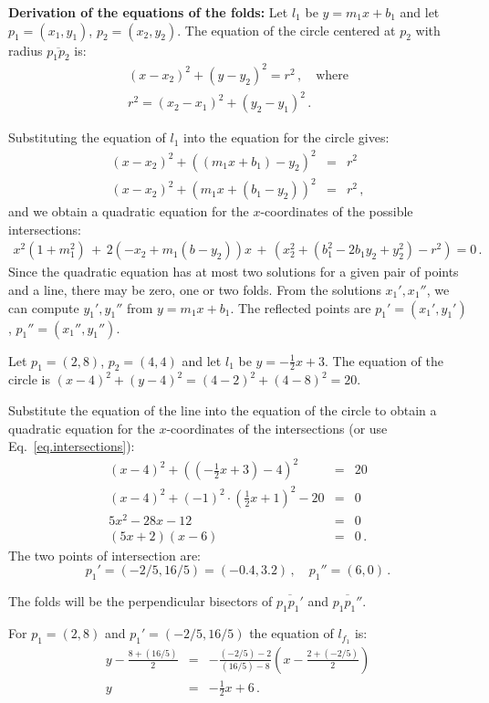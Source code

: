 \noindent\textbf{Derivation of the equations of the folds:}
Let $l_1$ be $y=m_1x + b_1$ and let $p_1=(x_1,y_1)$, $p_2=(x_2,y_2)$. The equation of the circle centered at $p_2$ with radius $\overline{p_1p_2}$ is:
\begin{eqnarray*}
(x-x_2)^2 + (y-y_2)^2 = r^2\,,\quad \textrm{where}\\
r^2= (x_2-x_1)^2 + (y_2-y_1)^2\,.
\end{eqnarray*}

\newpage

Substituting the equation of $l_1$ into the equation for the circle gives:
\begin{eqnarray*}
(x-x_2)^2+((m_1x+b_1)-y_2)^2&=&r^2\\
(x-x_2)^2+(m_1x+(b_1-y_2))^2&=&r^2\,,
\end{eqnarray*}
and we obtain a quadratic equation for the $x$-coordinates of the possible intersections:
\begin{align}
x^2(1+m_1^2) \,+\, 2(-x_2+m_1(b-y_2))x \,+\,(x_2^2 + (b_1^2 - 2b_1y_2+y_2^2)-r^2)=0\,.\label{eq.intersections}
\end{align}
Since the quadratic equation has at most two solutions for a given pair of points and a line, there may be zero, one or two folds. From the solutions $x_1',x_1''$, we can compute $y_1',y_1''$ from $y=m_1x+b_1$. The reflected points are $p_1'=(x_1',y_1')$, $p_1''=(x_1'',y_1'')$.
\begin{example}
Let $p_1=(2,8)$, $p_2=(4,4)$ and let $l_1$ be $y=-\frac{1}{2}x +3$. The equation of the circle is $(x-4)^2 + (y-4)^2 = (4-2)^2+(4-8)^2=20$.

Substitute the equation of the line into the equation of the circle to obtain a quadratic equation for the $x$-coordinates of the intersections (or use Eq.~\ref{eq.intersections}):
\begin{eqnarray*}
(x-4)^2 + \left(\left(-\frac{1}{2}x+3\right)-4\right)^2&=&20\\
(x-4)^2 + (-1)^2\cdot\left(\frac{1}{2}x+1\right)^2-20&=&0\\
5x^2 -28x -12&=&0\\
(5x+2)(x-6)&=&0\,.
\end{eqnarray*}
The two points of intersection are:
\[
p_1'=(-2/5,16/5) = (-0.4,3.2)\,,\quad p_1''=(6,0)\,.
\]
\end{example}
The folds will be the perpendicular bisectors of $\overline{p_1p_1'}$ and $\overline{p_1p_1''}$.
\begin{example}
For $p_1=(2,8)$ and $p_1'=(-2/5,16/5)$ the equation of $l_{f_1}$  is:
\begin{eqnarray*}
y-\frac{8+(16/5)}{2}&=&-\frac{(-2/5)-2}{(16/5)-8}\left(x-\frac{2+\left(-2/5\right)}{2}\right)\\
y&=&-\frac{1}{2}x+6\,.
\end{eqnarray*}
\end{example}

